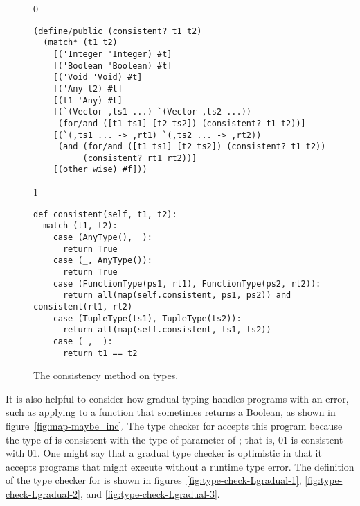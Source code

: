 \documentclass[7x10]{TimesAPriori_MIT}%
\newcommand{\gray}[1]{{\color{gray} #1}}
\def\racketEd{0}
\def\pythonEd{1}
\def\edition{1}
\newcommand{\racket}[1]{{\if\edition\racketEd{#1}\fi}}
\newcommand{\pythonColor}[0]{}
\newcommand{\python}[1]{{\if\edition\pythonEd\pythonColor #1\fi}}
\numberwithin{theorem}{chapter}
\numberwithin{definition}{chapter}
\numberwithin{equation}{chapter}
\begin{document}
\begin{figure}[tbp]
  \begin{tcolorbox}[colback=white]
{\if\edition\racketEd    
\begin{lstlisting}
(define/public (consistent? t1 t2)
  (match* (t1 t2)
    [('Integer 'Integer) #t]
    [('Boolean 'Boolean) #t]
    [('Void 'Void) #t]
    [('Any t2) #t]
    [(t1 'Any) #t]
    [(`(Vector ,ts1 ...) `(Vector ,ts2 ...))
     (for/and ([t1 ts1] [t2 ts2]) (consistent? t1 t2))]
    [(`(,ts1 ... -> ,rt1) `(,ts2 ... -> ,rt2))
     (and (for/and ([t1 ts1] [t2 ts2]) (consistent? t1 t2))
          (consistent? rt1 rt2))]
    [(other wise) #f]))
\end{lstlisting}
\fi}
{\if\edition\pythonEd\pythonColor
\begin{lstlisting}
def consistent(self, t1, t2):
  match (t1, t2):
    case (AnyType(), _):
      return True
    case (_, AnyType()):
      return True
    case (FunctionType(ps1, rt1), FunctionType(ps2, rt2)):
      return all(map(self.consistent, ps1, ps2)) and consistent(rt1, rt2)
    case (TupleType(ts1), TupleType(ts2)):
      return all(map(self.consistent, ts1, ts2))
    case (_, _):
      return t1 == t2
\end{lstlisting}  
  \fi}
\vspace{-5pt}
  \end{tcolorbox}

  \caption{The consistency method on types.}
\label{fig:consistent}
\end{figure}

It is also helpful to consider how gradual typing handles programs with an
error, such as applying  to a function that sometimes
returns a Boolean, as shown in figure~\ref{fig:map-maybe_inc}.  The
type checker for \LangGrad{} accepts this program because the type of
 is consistent with the type of parameter  of
; that is, 
\racket{}\python{}
is consistent with
\racket{}\python{}.
One might say that a gradual type checker is optimistic in that it
accepts programs that might execute without a runtime type error.
%
The definition of the type checker for \LangGrad{} is shown in
figures~\ref{fig:type-check-Lgradual-1}, \ref{fig:type-check-Lgradual-2},
and \ref{fig:type-check-Lgradual-3}.

\end{document}

